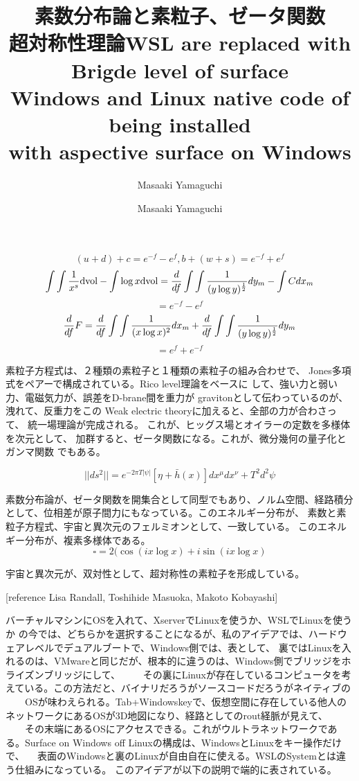 \documentclass{jsarticle}
\begin{document}
{\newpage
\title{素数分布論と素粒子、ゼータ関数　\\
超対称性理論}
\author{Masaaki Yamaguchi}

   $$ (u + d) + c = e^{-f} - e^{f}, b + (w + s) = e^{-f} + e^{f} $$
   $$ \int \int{1 \over x^s}\mathrm{dvol} - \int \log x \mathrm{dvol}
   = {d \over df}\int\int{1 \over (y \log y)^{1 \over 2}}dy_m
   - \int C dx_m $$
   $$ = e^{-f} - e^{f} $$
   $$ {d \over df}F = {d \over df}\int \int{1 \over (x \log x)^2}dx_m 
   + {d \over df}\int\int{1 \over (y \log y)^{1 \over 2}}dy_m $$
   $$ = e^{f} + e^{-f} $$

     素粒子方程式は、２種類の素粒子と１種類の素粒子の組み合わせで、
   Jones多項式をペアーで構成されている。Rico level理論をベースに
   して、強い力と弱い力、電磁気力が、誤差をD-brane間を重力が
   gravitonとして伝わっているのが、洩れて、反重力をこの
   Weak electric theoryに加えると、全部の力が合わさって、
   統一場理論が完成される。
   これが、ヒッグス場とオイラーの定数を多様体を次元として、
   加群すると、ゼータ関数になる。これが、微分幾何の量子化とガンマ関数
   でもある。





   $$ ||ds^2|| = e^{-2 \pi T|\psi|}[\eta + \bar{h}(x)]dx^{\mu}dx^{\nu}
   + T^2 d^2 \psi $$
   


      素数分布論が、ゼータ関数を開集合として同型でもあり、ノルム空間、経路積分
   として、位相差が原子間力にもなっている。このエネルギー分布が、
   素数と素粒子方程式、宇宙と異次元のフェルミオンとして、一致している。
   このエネルギー分布が、複素多様体である。
   $$\square = 2 (\cos (i x \log x) + i \sin(i x \log x) $$ 


      宇宙と異次元が、双対性として、超対称性の素粒子を形成している。　

      [reference Lisa Randall, Toshihide Masuoka, Makoto Kobayashi]

\newpage
\title{WSL are replaced with Brigde level of surface \\
Windows and Linux native code of being installed \\
with aspective surface on Windows}
\author{Masaaki Yamaguchi}

   

        バーチャルマシンにOSを入れて、XserverでLinuxを使うか、WSLでLinuxを使うか
   の今では、どちらかを選択することになるが、私のアイデアでは、ハードウェアレベルでデュアルブートで、Windows側では、表として、
   裏ではLinuxを入れるのは、VMwareと同じだが、根本的に違うのは、Windows側でブリッジをホライズンブリッジにして、
　　その裏にLinuxが存在しているコンピュータを考えている。この方法だと、バイナリだろうがソースコードだろうがネイティブの
　　OSが味わえられる。Tab+Windowskeyで、仮想空間に存在している他人のネットワークにあるOSが3D地図になり、経路としてのrout経脈が見えて、
　　その末端にあるOSにアクセスできる。これがウルトラネットワークである。Surface on Windows off Linuxの構成は、WindowsとLinuxをキー操作だけで、
　表面のWindowsと裏のLinuxが自由自在に使える。WSLのSystemとは違う仕組みになっている。
   このアイデアが以下の説明で端的に表されている。 


}
\end{document}
